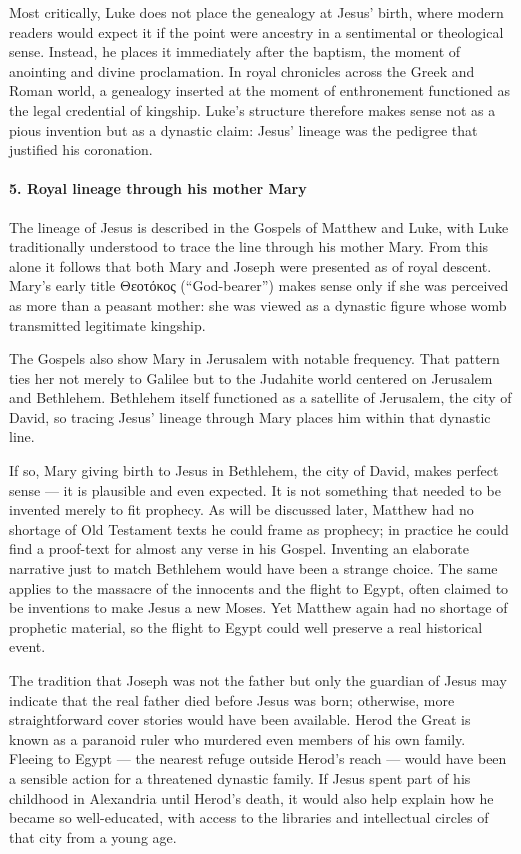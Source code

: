 Most critically, Luke does not place the genealogy at Jesus’ birth, where modern readers would expect it if the point were ancestry in a sentimental or theological sense.
Instead, he places it immediately after the baptism, the moment of anointing and divine proclamation.
In royal chronicles across the Greek and Roman world, a genealogy inserted at the moment of enthronement functioned as the legal credential of kingship.
Luke’s structure therefore makes sense not as a pious invention but as a dynastic claim: Jesus’ lineage was the pedigree that justified his coronation.

\paragraph{5.
Royal lineage through his mother Mary}\label{par:royal-lineage-through-his-mother-mary}

The lineage of Jesus is described in the Gospels of Matthew and Luke, with Luke traditionally understood to trace the line through his mother Mary.
From this alone it follows that both Mary and Joseph were presented as of royal descent.
Mary’s early title Θεοτόκος (“God-bearer”) makes sense only if she was perceived as more than a peasant mother: she was viewed as a dynastic figure whose womb transmitted legitimate kingship.

The Gospels also show Mary in Jerusalem with notable frequency.
That pattern ties her not merely to Galilee but to the Judahite world centered on Jerusalem and Bethlehem.
Bethlehem itself functioned as a satellite of Jerusalem, the city of David, so tracing Jesus’ lineage through Mary places him within that dynastic line.

If so, Mary giving birth to Jesus in Bethlehem, the city of David, makes perfect sense — it is plausible and even expected.
It is not something that needed to be invented merely to fit prophecy.
As will be discussed later, Matthew had no shortage of Old Testament texts he could frame as prophecy; in practice he could find a proof-text for almost any verse in his Gospel.
Inventing an elaborate narrative just to match Bethlehem would have been a strange choice.
The same applies to the massacre of the innocents and the flight to Egypt, often claimed to be inventions to make Jesus a new Moses.
Yet Matthew again had no shortage of prophetic material, so the flight to Egypt could well preserve a real historical event.

The tradition that Joseph was not the father but only the guardian of Jesus may indicate that the real father died before Jesus was born; otherwise, more straightforward cover stories would have been available.
Herod the Great is known as a paranoid ruler who murdered even members of his own family.
Fleeing to Egypt — the nearest refuge outside Herod’s reach — would have been a sensible action for a threatened dynastic family.
If Jesus spent part of his childhood in Alexandria until Herod’s death, it would also help explain how he became so well-educated, with access to the libraries and intellectual circles of that city from a young age.

